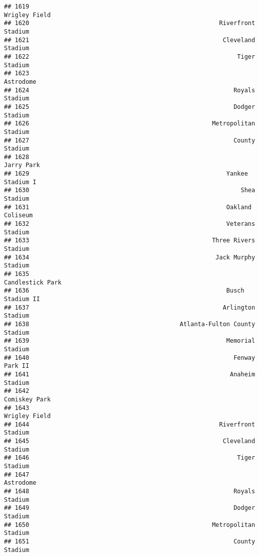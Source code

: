 \documentclass[]{article}
\begin{document}
\begin{verbatim}
## 1619                                                          Wrigley Field
## 1620                                                     Riverfront Stadium
## 1621                                                      Cleveland Stadium
## 1622                                                          Tiger Stadium
## 1623                                                              Astrodome
## 1624                                                         Royals Stadium
## 1625                                                         Dodger Stadium
## 1626                                                   Metropolitan Stadium
## 1627                                                         County Stadium
## 1628                                                             Jarry Park
## 1629                                                       Yankee Stadium I
## 1630                                                           Shea Stadium
## 1631                                                       Oakland Coliseum
## 1632                                                       Veterans Stadium
## 1633                                                   Three Rivers Stadium
## 1634                                                    Jack Murphy Stadium
## 1635                                                       Candlestick Park
## 1636                                                       Busch Stadium II
## 1637                                                      Arlington Stadium
## 1638                                          Atlanta-Fulton County Stadium
## 1639                                                       Memorial Stadium
## 1640                                                         Fenway Park II
## 1641                                                        Anaheim Stadium
## 1642                                                          Comiskey Park
## 1643                                                          Wrigley Field
## 1644                                                     Riverfront Stadium
## 1645                                                      Cleveland Stadium
## 1646                                                          Tiger Stadium
## 1647                                                              Astrodome
## 1648                                                         Royals Stadium
## 1649                                                         Dodger Stadium
## 1650                                                   Metropolitan Stadium
## 1651                                                         County Stadium

\end{verbatim}
\end{document}
